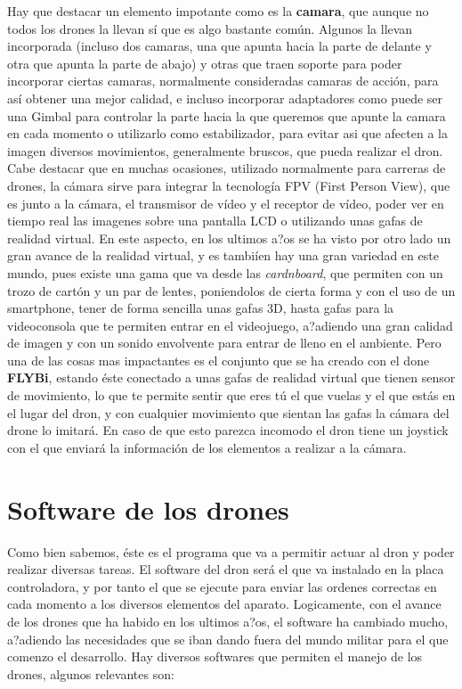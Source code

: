 \hspace{1 cm} Hay que destacar un elemento impotante como es la \textbf{camara}, que aunque no todos los drones la llevan s\'i que es algo bastante com\'un. Algunos la llevan incorporada (incluso dos camaras, una que apunta hacia la parte de delante y otra que apunta la parte de abajo) y otras que traen soporte para poder incorporar ciertas camaras, normalmente consideradas camaras de acci\'on, para as\'i obtener una mejor calidad, e incluso incorporar adaptadores como puede ser una Gimbal para controlar la parte hacia la que queremos que apunte la camara en cada momento o utilizarlo como estabilizador, para evitar asi que afecten a la imagen diversos movimientos, generalmente bruscos, que pueda realizar el dron. Cabe destacar que en muchas ocasiones, utilizado normalmente para carreras de drones, la c\'amara sirve para integrar la tecnolog\'ia FPV (First Person View), que es junto a la c\'amara, el transmisor de v\'ideo y el receptor de v\'ideo, poder ver en tiempo real las imagenes sobre una pantalla LCD o utilizando unas gafas de realidad virtual. En este aspecto, en los ultimos a?os se ha visto por otro lado un gran avance de la realidad virtual, y es tambi\'ien hay una gran variedad en este mundo, pues existe una gama que va desde las \emph{cardnboard}, que permiten con un trozo de cart\'on y un par de lentes, poniendolos de cierta forma y con el uso de un smartphone, tener de forma sencilla unas gafas 3D, hasta gafas para la videoconsola que te permiten entrar en el videojuego, a?adiendo una gran calidad de imagen y con un sonido envolvente para entrar de lleno en el ambiente. Pero una de las cosas mas impactantes es el conjunto que se ha creado con el done \textbf{FLYBi}, estando \'este conectado a unas gafas de realidad virtual que tienen sensor de movimiento, lo que te permite sentir que eres t\'u el que vuelas y el que est\'as en el lugar del dron, y con cualquier movimiento que sientan las gafas la c\'amara del drone lo imitar\'a. En caso de que esto parezca incomodo el dron tiene un joystick con el que enviar\'a la informaci\'on de los elementos a realizar a la c\'amara. 
 
\section{Software de los drones}
Como bien sabemos, \'este es el programa que va a permitir actuar al dron y poder realizar diversas tareas. El software del dron ser\'a el que va instalado en la placa controladora, y por tanto el que se ejecute para enviar las ordenes correctas en cada momento a los diversos elementos del aparato. Logicamente, con el avance de los drones que ha habido en los ultimos a?os, el software ha cambiado mucho, a?adiendo las necesidades que se iban dando fuera del mundo militar para el que comenzo el desarrollo. Hay diversos softwares que permiten el manejo de los drones, algunos relevantes son:

